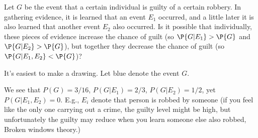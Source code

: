 

\setcounter{theorem}{13}
\begin{exercise}[BH.2.14] 
Let $G$ be the event that a certain individual is guilty of a certain robbery. In gathering evidence, it is learned that an event $E_1$ occurred, and a little later it is also learned that another event $E_2$ also occurred. Is it possible that individually, these pieces of evidence increase the chance of guilt (so $\P{G|E_1} > \P{G}$ and $\P{G|E_2} > \P{G}$), but together they decrease the chance of guilt (so $\P{G|E_1,E_2} < \P{G}$)?
	\begin{solution}
	It's easiest to make a drawing. Let blue denote the event $G$.
	\begin{center}
	\end{center}
	We see that $P(G) = 3/16$, $P(G|E_{1})=2/3$, $P(G|E_{2})=1/2$, yet $P(G|E_{1},E_{2})=0$. E.g., $E_i$ denote that person is robbed by someone (if you feel like the only one carrying out a crime, the guilty level might be high, but unfortunately the guilty may reduce when you learn someone else also robbed,  Broken windows theory.)
\end{solution}
\end{exercise}

